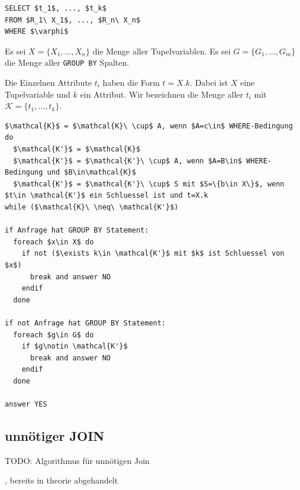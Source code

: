 \begin{lstlisting}[mathescape]
SELECT $t_1$, ..., $t_k$
FROM $R_1\ X_1$, ..., $R_n\ X_n$
WHERE $\varphi$
\end{lstlisting}

Es sei $X=\{X_1, ..., X_n\}$ die Menge aller Tupelvariablen. Es sei $G=\{G_1, ..., G_m\}$ die Menge aller \verb|GROUP BY| Spalten.

Die Einzelnen Attribute $t_i$ haben die Form $t = X.k$. Dabei ist $X$ eine Tupelvariable und $k$ ein Attribut. Wir bezeichnen die Menge aller $t_i$ mit $\mathcal{K}=\{t_1,...,t_k\}$.

\begin{lstlisting}[mathescape]
$\mathcal{K}$ = $\mathcal{K}\ \cup$ A, wenn $A=c\in$ WHERE-Bedingung
do 
  $\mathcal{K'}$ = $\mathcal{K}$
  $\mathcal{K'}$ = $\mathcal{K'}\ \cup$ A, wenn $A=B\in$ WHERE-Bedingung und $B\in\mathcal{K}$
  $\mathcal{K'}$ = $\mathcal{K'}\ \cup$ S mit $S=\{b\in X\}$, wenn $t\in \mathcal{K'}$ ein Schluessel ist und t=X.k
while ($\mathcal{K}\ \neq\ \mathcal{K'}$)

if Anfrage hat GROUP BY Statement:
  foreach $x\in X$ do
    if not ($\exists k\in \mathcal{K'}$ mit $k$ ist Schluessel von $x$)
      break and answer NO
    endif
  done

if not Anfrage hat GROUP BY Statement:
  foreach $g\in G$ do
    if $g\notin \mathcal{K'}$
      break and answer NO
    endif
  done

answer YES
\end{lstlisting}


\subsection{unnötiger JOIN}

TODO: Algorithmus für unnötigen Join

\cite{joinelem1}, bereits in theorie abgehandelt
